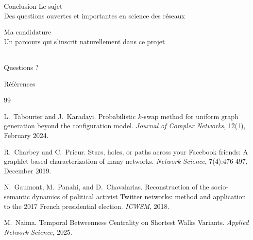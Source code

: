\documentclass[aspectratio=169, 12pt]{beamer}
\begin{document}
{
\begin{frame}{Conclusion}
  \textcolor{LIP6teal}{\normalsize Le sujet}\\[0.4em]
  \small Des questions ouvertes et importantes en science des réseaux

  \vspace{1.2em}

  \textcolor{LIP6teal}{\normalsize Ma candidature}\\[0.4em]
  \small Un parcours qui s'inscrit naturellement dans ce projet
\end{frame}
}
{
\begin{frame}[standout]
  \textcolor{white}{\Large Merci pour votre écoute !}\\[1em]
  \textcolor{LIP6teal}{\normalsize Questions ?}
\end{frame}
}

\appendix
\begin{frame}[allowframebreaks]{Références}
  \small
  \begin{thebibliography}{99}

    L.~Tabourier and J.~Karadayi.
    \newblock Probabilistic $k$-swap method for uniform graph generation beyond
      the configuration model.
    \newblock \textit{Journal of Complex Networks}, 12(1), February 2024.

    R.~Charbey and C.~Prieur.
    \newblock Stars, holes, or paths across your Facebook friends: A
      graphlet-based characterization of many networks.
    \newblock \textit{Network Science}, 7(4):476-497, December 2019.

    N.~Gaumont, M.~Panahi, and D.~Chavalarias.
    \newblock Reconstruction of the socio-semantic dynamics of political activist
      Twitter networks: method and application to the 2017 French presidential
      election.
    \newblock \textit{ICWSM}, 2018.

    M.~Naima. 
    \newblock Temporal Betweenness Centrality on Shortest Walks Variants. 
    \newblock \textit{Applied Network Science}, 2025.


  \end{thebibliography}
\end{frame}
\end{document}
